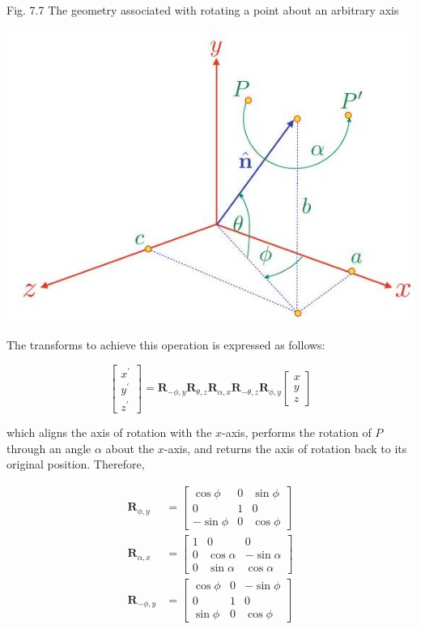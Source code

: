 \documentclass[10pt]{article}
\begin{document}
Fig. 7.7 The geometry associated with rotating a point about an arbitrary axis

\begin{center}
\includegraphics[max width=\textwidth]{2023_04_20_41f1ceac5a31dc7d1b59g-121}
\end{center}

The transforms to achieve this operation is expressed as follows:

$$
\left[\begin{array}{c}
x^{\prime} \\
y^{\prime} \\
z^{\prime}
\end{array}\right]=\mathbf{R}_{-\phi, y} \mathbf{R}_{\theta, z} \mathbf{R}_{\alpha, x} \mathbf{R}_{-\theta, z} \mathbf{R}_{\phi, y}\left[\begin{array}{l}
x \\
y \\
z
\end{array}\right]
$$

which aligns the axis of rotation with the $x$-axis, performs the rotation of $P$ through an angle $\alpha$ about the $x$-axis, and returns the axis of rotation back to its original position. Therefore,

$$
\begin{aligned}
\mathbf{R}_{\phi, y} & =\left[\begin{array}{ccc}
\cos \phi & 0 & \sin \phi \\
0 & 1 & 0 \\
-\sin \phi & 0 & \cos \phi
\end{array}\right] \\
\mathbf{R}_{\alpha, x} & =\left[\begin{array}{ccc}
1 & 0 & 0 \\
0 & \cos \alpha & -\sin \alpha \\
0 & \sin \alpha & \cos \alpha
\end{array}\right] \\
\mathbf{R}_{-\phi, y} & =\left[\begin{array}{ccc}
\cos \phi & 0 & -\sin \phi \\
0 & 1 & 0 \\
\sin \phi & 0 & \cos \phi
\end{array}\right]
\end{aligned}
$$
\end{document}
